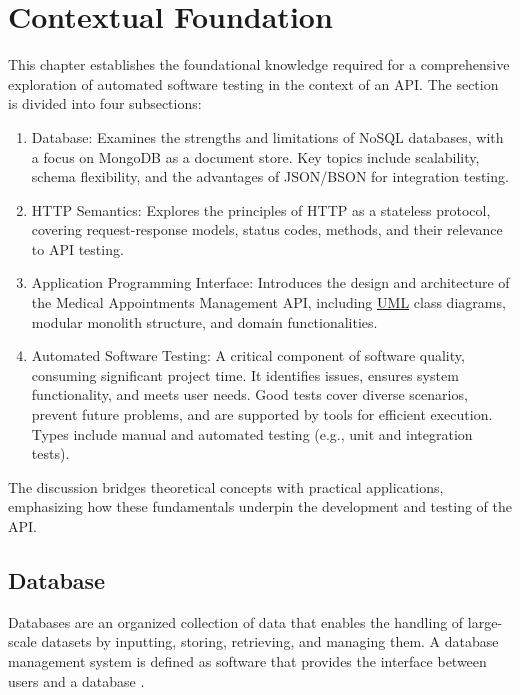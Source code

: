\section{Contextual Foundation}
\label{contextual_foundation}

This chapter establishes the foundational knowledge required for a comprehensive exploration of automated software testing in the context
 of an API. The section is divided into four subsections:

\begin{enumerate}
    \item Database: Examines the strengths and limitations of NoSQL databases, with a focus on MongoDB as a document store. 
    Key topics include scalability, schema flexibility, and the advantages of JSON/BSON for integration testing.
    \item HTTP Semantics: Explores the principles of HTTP as a stateless protocol, covering request-response models, status codes, 
    methods, and their relevance to API testing.
    \item Application Programming Interface: Introduces the design and architecture of the Medical Appointments Management API, 
    including \hyperref[appendix:glossary]{UML} class diagrams, modular monolith structure, and domain functionalities.
    \item Automated Software Testing: A critical component of software quality, consuming significant project time. It identifies issues, ensures system functionality, and meets user needs. Good tests cover diverse scenarios, prevent future problems, and are supported by tools for efficient execution. Types include manual and automated testing (e.g., unit and integration tests).
\end{enumerate}

The discussion bridges theoretical concepts with practical applications, emphasizing how these fundamentals underpin the development 
and testing of the API.

\subsection{Database}
\label{subsection:database}

Databases are an organized collection of data that enables the handling of large-scale datasets by inputting, storing, retrieving, 
and managing them. A database management system is defined as software that provides the interface between users and a database \cite{birgen2014sql}.

